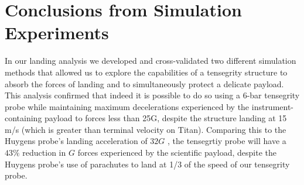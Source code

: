 \section{Conclusions from Simulation Experiments}
In our landing analysis we developed and cross-validated two different simulation methods that allowed us to explore the capabilities of a tensegrity structure to absorb the forces of landing and to simultaneously protect a delicate payload.  This analysis confirmed that indeed it is possible to do so using a 6-bar tensegrity probe while maintaining maximum decelerations experienced by the instrument-containing payload to forces less than 25G, despite the structure landing at 15 m/s (which is greater than terminal velocity on Titan).   Comparing this to the Huygens probe's landing acceleration of \(32G\) \cite{lorenz1994huygens}, the tensegrtiy probe will have a \(43\% \) reduction in \(G\) forces experienced by the scientific payload, despite the Huygens probe's use of parachutes to land at 1/3 of the speed of our tensegrity probe.

